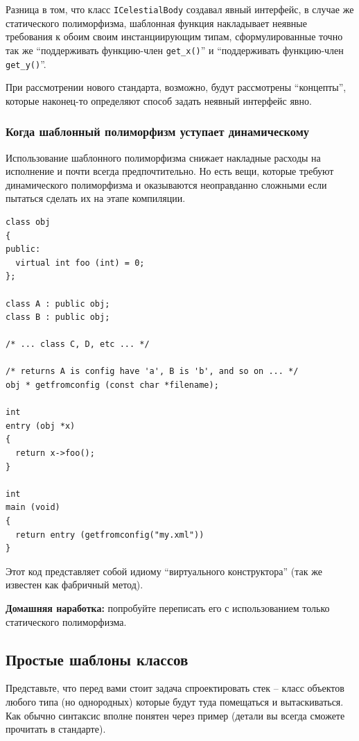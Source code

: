 \documentclass[a4paper,12pt,oneside]{article}
\begin{document}
Разница в том, что класс \lstinline!ICelestialBody! создавал явный интерфейс, в случае же статического полиморфизма, шаблонная функция накладывает неявные требования к обоим своим инстанциирующим типам, сформулированные точно так же ``поддерживать функцию-член \lstinline!get_x()!'' и ``поддерживать функцию-член \lstinline!get_y()!''. 

При рассмотрении нового стандарта, возможно, будут рассмотрены ``концепты'', которые наконец-то определяют способ задать неявный интерфейс явно.

\subsubsection{Когда шаблонный полиморфизм уступает динамическому}

Использование шаблонного полиморфизма снижает накладные расходы на исполнение и почти всегда предпочтительно. Но есть вещи, которые требуют динамического полиморфизма и оказываются неоправданно сложными если пытаться сделать их на этапе компиляции.

\begin{lstlisting}
class obj
{
public:
  virtual int foo (int) = 0;    
};

class A : public obj;
class B : public obj;

/* ... class C, D, etc ... */

/* returns A is config have 'a', B is 'b', and so on ... */
obj * getfromconfig (const char *filename);

int
entry (obj *x)
{
  return x->foo();
}

int
main (void)
{
  return entry (getfromconfig("my.xml"))
}
\end{lstlisting}

Этот код представляет собой идиому ``виртуального конструктора'' (так же известен как фабричный метод).

\textbf{Домашняя наработка:} попробуйте переписать его с использованием только статического полиморфизма.

\subsection{Простые шаблоны классов}

Представьте, что перед вами стоит задача спроектировать стек – класс объектов любого типа (но однородных) которые будут туда помещаться и вытаскиваться. Как обычно синтаксис вполне понятен через пример (детали вы всегда сможете прочитать в стандарте).
\end{document}
